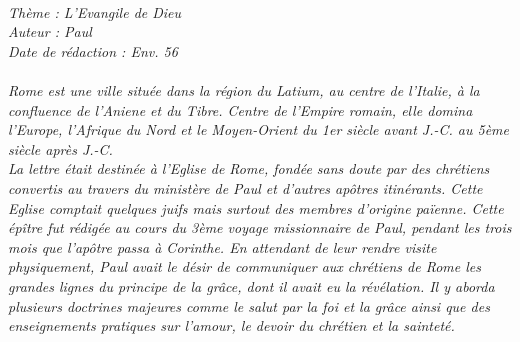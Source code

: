 \BFont
\noindent\hrulefill
{\footnotesize
\textit{
\bigskip
{\centering{}
\\Thème : L'Evangile de Dieu
\\Auteur : Paul
\\Date de rédaction : Env. 56\\}
}
\textit{
\\Rome est une ville située dans la région du Latium, au centre de l’Italie, à la confluence de l’Aniene et du Tibre. Centre de l’Empire romain,  elle domina  l’Europe, l’Afrique du Nord et le Moyen-Orient du 1er siècle avant J.-C. au 5ème siècle après J.-C.
\\La lettre était destinée à l’Eglise de Rome, fondée sans doute par des chrétiens convertis au  travers du ministère de Paul et d’autres apôtres itinérants. Cette Eglise comptait quelques juifs mais surtout des membres d’origine païenne. Cette épître fut rédigée au cours du 3ème voyage missionnaire de Paul,  pendant les trois mois que l’apôtre passa à Corinthe. En attendant de leur rendre visite physiquement, Paul avait le désir de communiquer aux chrétiens de Rome les grandes lignes du principe de la grâce, dont il avait eu la révélation. Il y aborda plusieurs doctrines majeures comme le salut par la foi et la grâce ainsi que des enseignements pratiques sur l’amour, le devoir du chrétien et la sainteté.\bigskip
}
}
\par\nobreak\noindent\hrulefill

